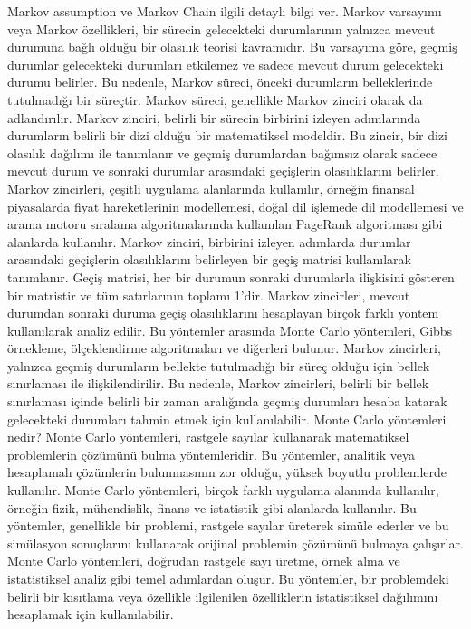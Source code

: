 \documentclass[11pt]{article}
\begin{document}
Markov assumption ve Markov Chain ilgili detaylı bilgi ver.
Markov varsayımı veya Markov özellikleri, bir sürecin gelecekteki durumlarının yalnızca mevcut durumuna bağlı olduğu bir olasılık teorisi kavramıdır. Bu varsayıma göre, geçmiş durumlar gelecekteki durumları etkilemez ve sadece mevcut durum gelecekteki durumu belirler. Bu nedenle, Markov süreci, önceki durumların belleklerinde tutulmadığı bir süreçtir.
Markov süreci, genellikle Markov zinciri olarak da adlandırılır. Markov zinciri, belirli bir sürecin birbirini izleyen adımlarında durumların belirli bir dizi olduğu bir matematiksel modeldir. Bu zincir, bir dizi olasılık dağılımı ile tanımlanır ve geçmiş durumlardan bağımsız olarak sadece mevcut durum ve sonraki durumlar arasındaki geçişlerin olasılıklarını belirler.
Markov zincirleri, çeşitli uygulama alanlarında kullanılır, örneğin finansal piyasalarda fiyat hareketlerinin modellemesi, doğal dil işlemede dil modellemesi ve arama motoru sıralama algoritmalarında kullanılan PageRank algoritması gibi alanlarda kullanılır.
Markov zinciri, birbirini izleyen adımlarda durumlar arasındaki geçişlerin olasılıklarını belirleyen bir geçiş matrisi kullanılarak tanımlanır. Geçiş matrisi, her bir durumun sonraki durumlarla ilişkisini gösteren bir matristir ve tüm satırlarının toplamı 1'dir.
Markov zincirleri, mevcut durumdan sonraki duruma geçiş olasılıklarını hesaplayan birçok farklı yöntem kullanılarak analiz edilir. Bu yöntemler arasında Monte Carlo yöntemleri, Gibbs örnekleme, ölçeklendirme algoritmaları ve diğerleri bulunur.
Markov zincirleri, yalnızca geçmiş durumların bellekte tutulmadığı bir süreç olduğu için bellek sınırlaması ile ilişkilendirilir. Bu nedenle, Markov zincirleri, belirli bir bellek sınırlaması içinde belirli bir zaman aralığında geçmiş durumları hesaba katarak gelecekteki durumları tahmin etmek için kullanılabilir.
Monte Carlo yöntemleri nedir?
Monte Carlo yöntemleri, rastgele sayılar kullanarak matematiksel problemlerin çözümünü bulma yöntemleridir. Bu yöntemler, analitik veya hesaplamalı çözümlerin bulunmasının zor olduğu, yüksek boyutlu problemlerde kullanılır.
Monte Carlo yöntemleri, birçok farklı uygulama alanında kullanılır, örneğin fizik, mühendislik, finans ve istatistik gibi alanlarda kullanılır. Bu yöntemler, genellikle bir problemi, rastgele sayılar üreterek simüle ederler ve bu simülasyon sonuçlarını kullanarak orijinal problemin çözümünü bulmaya çalışırlar.
Monte Carlo yöntemleri, doğrudan rastgele sayı üretme, örnek alma ve istatistiksel analiz gibi temel adımlardan oluşur. Bu yöntemler, bir problemdeki belirli bir kısıtlama veya özellikle ilgilenilen özelliklerin istatistiksel dağılımını hesaplamak için kullanılabilir.
\end{document}
